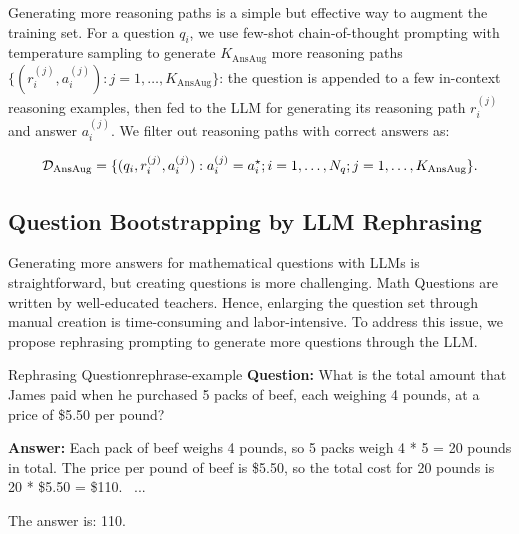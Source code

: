 Generating more reasoning paths is a simple but effective way to augment the training set. For a question $q_i$, we use few-shot chain-of-thought prompting with temperature sampling to generate $K_{\text{AnsAug}}$ more reasoning paths $\{(r_i^{(j)}, a_i^{(j)}): j=1,\dots, K_{\text{AnsAug}}\}$:
the question is appended to a few in-context reasoning examples, then fed to the LLM for generating its reasoning path $r_i^{(j)}$ and answer $a_i^{(j)}$. We filter out reasoning paths with correct answers as:

\begin{equation}
\small
\mathcal{D}_{\text{AnsAug}} = \{(q_i, r_i^{(j)}, a_i^{(j)}): a_i^{(j)} = a_i^\star;  i=1,\dots, N_q; j=1,\dots, K_{\text{AnsAug}}\}.
\end{equation}

\subsection{Question Bootstrapping by LLM Rephrasing}

Generating more answers for mathematical questions with LLMs is straightforward, but creating questions is more challenging. Math Questions are written by well-educated teachers. Hence, enlarging the question set through manual creation is time-consuming and labor-intensive. To address this issue, we propose rephrasing prompting to generate more questions through the LLM.

\begin{exmp}{Rephrasing Question}{rephrase-example}
\small
\textbf{Question:} What is the total amount that James paid when he purchased 5 packs of beef, each weighing 4 pounds, at a price of \$5.50 per pound? 

\textbf{Answer:} Each pack of beef weighs 4 pounds, so 5 packs weigh 4 * 5 = 20 pounds in total. The price per pound of beef is \$5.50, so the total cost for 20 pounds is 20 * \$5.50 = \$110. ~...~

The answer is: 110.
\end{exmp}

